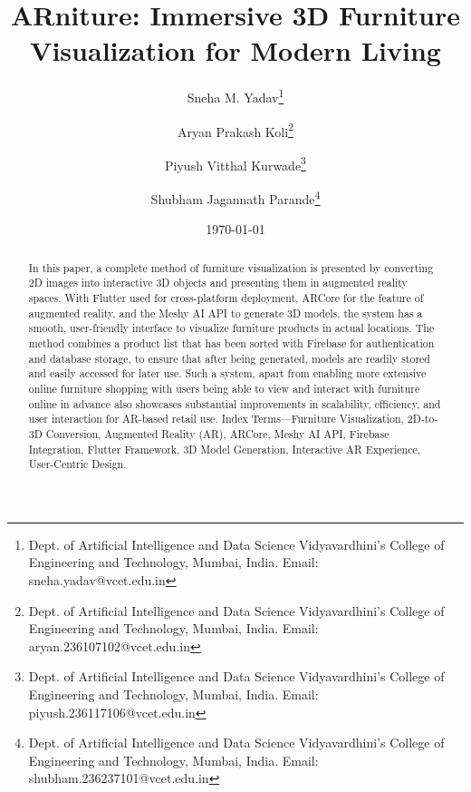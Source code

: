 \documentclass[12pt, a4paper]{article}
\title{ARniture: Immersive 3D Furniture Visualization for Modern Living}
\author{Sneha M. Yadav\thanks{Dept. of Artificial Intelligence and Data Science Vidyavardhini's College of Engineering and Technology, Mumbai, India. Email: sneha.yadav@vcet.edu.in} \and Aryan Prakash Koli\thanks{Dept. of Artificial Intelligence and Data Science Vidyavardhini's College of Engineering and Technology, Mumbai, India. Email: aryan.236107102@vcet.edu.in} \and Piyush Vitthal Kurwade\thanks{Dept. of Artificial Intelligence and Data Science Vidyavardhini's College of Engineering and Technology, Mumbai, India. Email: piyush.236117106@vcet.edu.in} \and Shubham Jagannath Parande\thanks{Dept. of Artificial Intelligence and Data Science Vidyavardhini's College of Engineering and Technology, Mumbai, India. Email: shubham.236237101@vcet.edu.in}}
\date{\today}
\begin{document}
\maketitle

\begin{abstract}
In this paper, a complete method of furniture visualization is presented by converting 2D images into interactive 3D objects and presenting them in augmented reality spaces. With Flutter used for cross-platform deployment, ARCore for the feature of augmented reality, and the Meshy AI API to generate 3D models, the system has a smooth, user-friendly interface to visualize furniture products in actual locations. The method combines a product list that has been sorted with Firebase for authentication and database storage, to ensure that after being generated, models are readily stored and easily accessed for later use. Such a system, apart from enabling more extensive online furniture shopping with users being able to view and interact with furniture online in advance also showcases substantial improvements in scalability, efficiency, and user interaction for AR-based retail use. Index Terms---Furniture Visualization, 2D-to-3D Conversion, Augmented Reality (AR), ARCore, Meshy AI API, Firebase Integration, Flutter Framework, 3D Model Generation, Interactive AR Experience, User-Centric Design.
\end{abstract}
\end{document}
